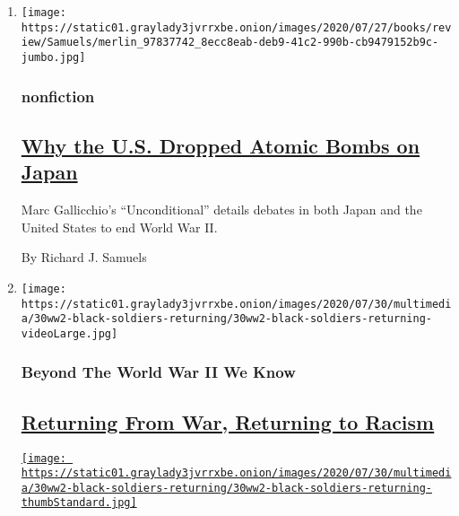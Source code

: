 \begin{enumerate}
\def\labelenumi{\arabic{enumi}.}
\item
  \texttt{[image: https://static01.graylady3jvrrxbe.onion/images/2020/07/27/books/review/Samuels/merlin\_97837742\_8ecc8eab-deb9-41c2-990b-cb9479152b9c-jumbo.jpg]}

  \hypertarget{nonfiction}{%
  \subsubsection{nonfiction}\label{nonfiction}}

  \hypertarget{why-the-us-dropped-atomic-bombs-on-japan}{%
  \subsection{\texorpdfstring{\href{/2020/08/03/books/review/unconditional-marc-gallicchio.html}{Why
  the U.S. Dropped Atomic Bombs on
  Japan}}{Why the U.S. Dropped Atomic Bombs on Japan}}\label{why-the-us-dropped-atomic-bombs-on-japan}}

  Marc Gallicchio's ``Unconditional'' details debates in both Japan and
  the United States to end World War II.

  By Richard J. Samuels
\item
  \texttt{[image: https://static01.graylady3jvrrxbe.onion/images/2020/07/30/multimedia/30ww2-black-soldiers-returning/30ww2-black-soldiers-returning-videoLarge.jpg]}

  \hypertarget{beyond-the-world-war-ii-we-know-1}{%
  \subsubsection{Beyond The World War II We
  Know}\label{beyond-the-world-war-ii-we-know-1}}

  \hypertarget{returning-from-war-returning-to-racism}{%
  \subsection{\texorpdfstring{\href{/2020/07/30/magazine/black-soldiers-wwii-racism.html}{Returning
  From War, Returning to
  Racism}}{Returning From War, Returning to Racism}}\label{returning-from-war-returning-to-racism}}

  \href{/2020/07/30/magazine/black-soldiers-wwii-racism.html}{\texttt{[image: https://static01.graylady3jvrrxbe.onion/images/2020/07/30/multimedia/30ww2-black-soldiers-returning/30ww2-black-soldiers-returning-thumbStandard.jpg]}}


\end{enumerate}
